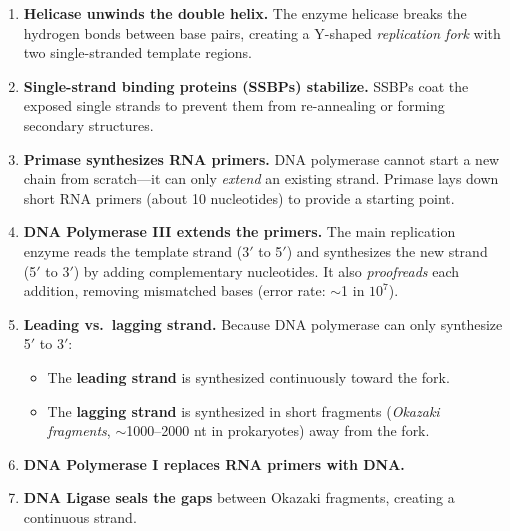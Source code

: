 \begin{enumerate}[leftmargin=1.8em]
  \item \textbf{Helicase unwinds the double helix.} The enzyme helicase breaks the hydrogen bonds between base pairs, creating a Y-shaped \emph{replication fork} with two single-stranded template regions.

  \item \textbf{Single-strand binding proteins (SSBPs) stabilize.} SSBPs coat the exposed single strands to prevent them from re-annealing or forming secondary structures.

  \item \textbf{Primase synthesizes RNA primers.} DNA polymerase cannot start a new chain from scratch---it can only \emph{extend} an existing strand. Primase lays down short RNA primers (about 10 nucleotides) to provide a starting point.

  \item \textbf{DNA Polymerase III extends the primers.} The main replication enzyme reads the template strand (3$'$ to 5$'$) and synthesizes the new strand (5$'$ to 3$'$) by adding complementary nucleotides. It also \emph{proofreads} each addition, removing mismatched bases (error rate: $\sim$1 in $10^7$).

  \item \textbf{Leading vs.\ lagging strand.} Because DNA polymerase can only synthesize 5$'$ to 3$'$:
  \begin{itemize}
    \item The \textbf{leading strand} is synthesized continuously toward the fork.
    \item The \textbf{lagging strand} is synthesized in short fragments (\emph{Okazaki fragments}, $\sim$1000--2000 nt in prokaryotes) away from the fork.
  \end{itemize}

  \item \textbf{DNA Polymerase I replaces RNA primers with DNA.}

  \item \textbf{DNA Ligase seals the gaps} between Okazaki fragments, creating a continuous strand.
\end{enumerate}

